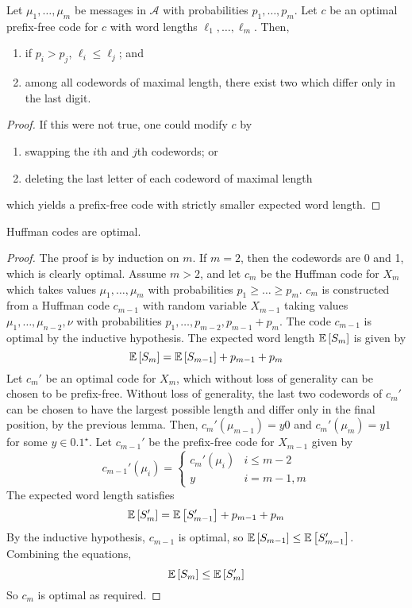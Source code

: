 \begin{lemma}
    Let \( \mu_1, \dots, \mu_m \) be messages in \( \mathcal A \) with probabilities \( p_1, \dots, p_m \).
    Let \( c \) be an optimal prefix-free code for \( c \) with word lengths \( \ell_1, \dots, \ell_m \).
    Then,
    \begin{enumerate}
        \item if \( p_i > p_j \), \( \ell_i \leq \ell_j \); and
        \item among all codewords of maximal length, there exist two which differ only in the last digit.
    \end{enumerate}
\end{lemma}
\begin{proof}
    If this were not true, one could modify \( c \) by
    \begin{enumerate}
        \item swapping the \( i \)th and \( j \)th codewords; or
        \item deleting the last letter of each codeword of maximal length
    \end{enumerate}
    which yields a prefix-free code with strictly smaller expected word length.
\end{proof}
\begin{theorem}
    Huffman codes are optimal.
\end{theorem}
\begin{proof}
    The proof is by induction on \( m \).
    If \( m = 2 \), then the codewords are 0 and 1, which is clearly optimal.
    Assume \( m > 2 \), and let \( c_m \) be the Huffman code for \( X_m \) which takes values \( \mu_1, \dots, \mu_m \) with probabilities \( p_1 \geq \dots \geq p_m \).
    \( c_m \) is constructed from a Huffman code \( c_{m-1} \) with random variable \( X_{m-1} \) taking values \( \mu_1, \dots, \mu_{n-2}, \nu \) with probabilities \( p_1, \dots, p_{m-2}, p_{m-1} + p_m \).
    The code \( c_{m-1} \) is optimal by the inductive hypothesis.
    The expected word length \( \mathbb{E}\left[{S_m}\right] \) is given by
    \[ \mathbb{E}\left[{S_m}\right] = \mathbb{E}\left[{S_{m-1}}\right] + p_{m-1} + p_m \]
    Let \( c_m' \) be an optimal code for \( X_m \), which without loss of generality can be chosen to be prefix-free.
    Without loss of generality, the last two codewords of \( c_m' \) can be chosen to have the largest possible length and differ only in the final position, by the previous lemma.
    Then, \( c_m'(\mu_{m-1}) = y 0 \) and \( c_m'(\mu_m) = y 1 \) for some \( y \in \qty{0,1}^\star \).
    Let \( c_{m-1}' \) be the prefix-free code for \( X_{m-1} \) given by
    \[ c_{m-1}'(\mu_i) = \begin{cases}
        c_m'(\mu_i) & i \leq m-2 \\
        y & i = m-1, m
    \end{cases} \]
    The expected word length satisfies
    \[ \mathbb{E}\left[{S_m'}\right] = \mathbb{E}\left[{S_{m-1}'}\right] + p_{m-1} + p_m \]
    By the inductive hypothesis, \( c_{m-1} \) is optimal, so \( \mathbb{E}\left[{S_{m-1}}\right] \leq \mathbb{E}\left[{S_{m-1}'}\right] \).
    Combining the equations,
    \[ \mathbb{E}\left[{S_m}\right] \leq \mathbb{E}\left[{S_m'}\right] \]
    So \( c_m \) is optimal as required.
\end{proof}
